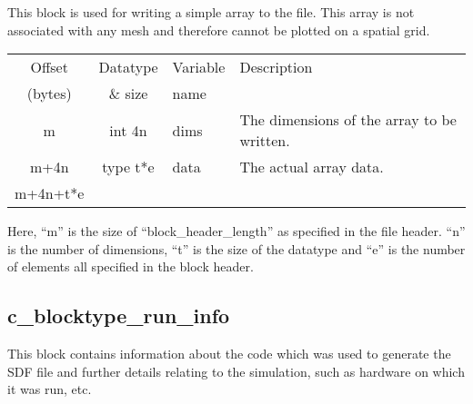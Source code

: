 \documentclass[12pt]{article}
\newcommand{\subsubsec}{\subsection}
\begin{document}
This block is used for writing a simple array to the file. This array
is not associated with any mesh and therefore cannot be plotted on a
spatial grid.\\

\begin{center}
\begin{tabularx}{0.9\textwidth}[!hbt]{cclX}
  Offset & Datatype & Variable & Description\\
  (bytes) & \& size & name &
  \\\toprule

  m & int 4n & dims & The dimensions of the array to be written.
  \\\midrule

  m+4n & type t*e & data & The actual array data.
  \\\midrule

  m+4n+t*e &
\end{tabularx}
\end{center}\vspace{10pt}

Here, ``m'' is the size of ``block\_header\_length'' as specified in the file
header.  ``n'' is the number of dimensions, ``t'' is the size of the datatype
and ``e'' is the number of elements all specified in the block header.



\subsubsec{c\_blocktype\_run\_info}

This block contains information about the code which was used to generate
the SDF file and further details relating to the simulation, such as
hardware on which it was run, etc.\\
\end{document}
